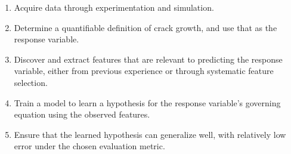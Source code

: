 \begin{enumerate}
  \item Acquire data through experimentation and simulation.
  \item Determine a quantifiable definition of crack growth, and use that as the response variable.
  \item Discover and extract features that are relevant to predicting the response variable, either from previous experience or through systematic feature selection.
  \item Train a model to learn a hypothesis for the response variable's governing equation using the observed features.
  \item Ensure that the learned hypothesis can generalize well, with relatively low error under the chosen evaluation metric.
\end{enumerate}




